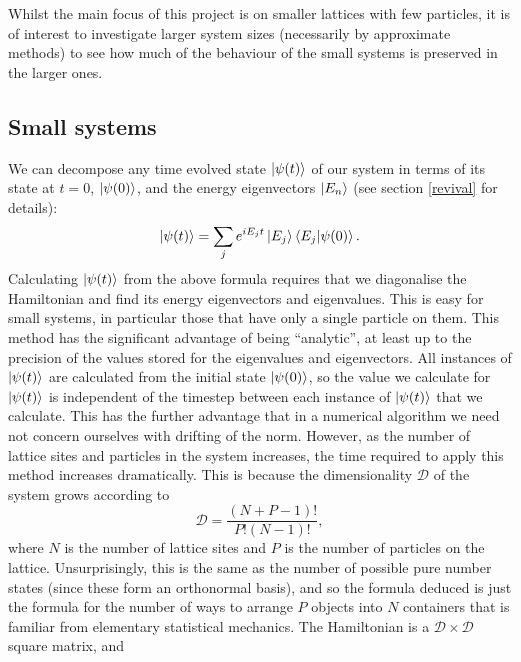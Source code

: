 \documentclass[a4paper,10pt]{article}
\theoremstyle{plain}
\begin{document}
Whilst the main focus of this project is on smaller lattices with few 
particles, it is of interest to investigate larger system sizes (necessarily 
by approximate methods) to see how much of the behaviour of the small systems 
is preserved in the larger ones.

\subsection{Small systems}

We can decompose any time evolved state $\ket{\psi(t)}$ of our system in terms 
of its state at $t=0$, $\ket{\psi(0)}$, and the energy eigenvectors $\ket{E_n}$ 
(see section \ref{revival} for details):
\begin{equation}
  \ket{\psi(t)}=\sum_je^{iE_{j}t}\ket{E_j}\braket{E_j|\psi(0)}.
\end{equation}
Calculating $\ket{\psi(t)}$ from the above formula requires that we diagonalise
the Hamiltonian and find its energy eigenvectors and eigenvalues. This is easy
for small systems, in particular those that have only a single particle on them.
This method has the significant advantage of being ``analytic'', at least up to
the precision of the values stored for the eigenvalues and eigenvectors. All
instances of $\ket{\psi(t)}$ are calculated from the initial state
$\ket{\psi(0)}$, so the value we calculate for $\ket{\psi(t)}$ is independent of the timestep
between each instance of $\ket{\psi(t)}$ that we calculate. This has the further
advantage that in a numerical algorithm we need not concern ourselves with
drifting of the norm. However, as the number of lattice
sites and particles in the system increases, the time required to apply this
method increases dramatically. This is because the dimensionality $\mathcal{D}$
of the system grows according to
\begin{equation}
 \mathcal{D}=\frac{\left(N+P-1\right)!}{P!\left(N-1\right)!},
 \label{dimensionality_exact}
\end{equation}
where $N$ is the number of lattice sites and $P$ is the number of particles on 
the lattice. Unsurprisingly, this is the same as the number of possible pure 
number states (since these form an orthonormal basis), and so the formula 
deduced is just the formula for the number of ways to arrange $P$ objects into 
$N$ containers that is familiar from elementary statistical mechanics.
The Hamiltonian is a $\mathcal{D}\times\mathcal{D}$ square matrix, and 
\end{document}
